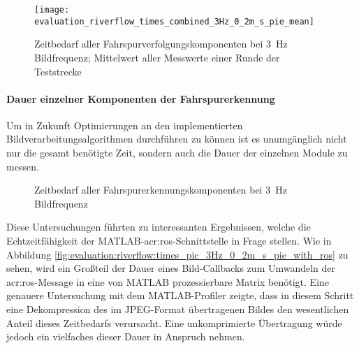 \begin{figure}[ht] %
	\centering
	\texttt{[image: evaluation\_riverflow\_times\_combined\_3Hz\_0\_2m\_s\_pie\_mean]}
	\label{fig:evaluation:riverflow:times_combined_3Hz_0_2m_s_pie_mean}
	\caption{Zeitbedarf aller Fahrspurverfolgungskomponenten bei \SI{3}{\hertz} Bildfrequenz; Mittelwert aller Messwerte einer Runde der Teststrecke}
\end{figure}

\paragraph{Dauer einzelner Komponenten der Fahrspurerkennung}
Um in Zukunft Optimierungen an den implementierten Bildverarbeitungsalgorithmen durchführen zu können ist es unumgänglich nicht nur die gesamt benötigte Zeit, sondern auch die Dauer der einzelnen Module zu messen.

\begin{figure}[ht] %
	\centering
	\qquad
	\qquad
	\caption{Zeitbedarf aller Fahrspurerkennungskomponenten bei \SI{3}{\hertz} Bildfrequenz}
\end{figure}

Diese Untersuchungen führten zu interessanten Ergebnissen, welche die Echtzeitfähigkeit der MATLAB-\gls{acr:ros}-Schnittstelle in Frage stellen. Wie in Abbildung \ref{fig:evaluation:riverflow:times_pic_3Hz_0_2m_s_pie_with_ros} zu sehen, wird ein Großteil der Dauer eines Bild-Callbacks zum Umwandeln der \gls{acr:ros}-Message in eine von MATLAB prozessierbare Matrix benötigt. Eine genauere Untersuchung mit dem MATLAB-Profiler zeigte, dass in diesem Schritt eine Dekompression des im JPEG-Format übertragenen Bildes den wesentlichen Anteil dieses Zeitbedarfs verursacht. Eine unkomprimierte Übertragung würde jedoch ein vielfaches dieser Dauer in Anspruch nehmen.

